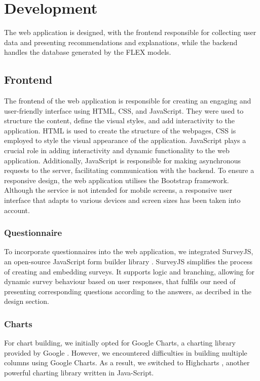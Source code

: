 \chapter{Development}

The web application is designed, 
with the frontend responsible for collecting user data and presenting recommendations and explanations, 
while the backend handles the database generated by the FLEX models. 


\section{Frontend}

The frontend of the web application is responsible for creating an engaging and user-friendly interface using HTML, CSS, and JavaScript. 
They were used to structure the content, define the visual styles, and add interactivity to the application.
HTML is used to create the structure of the webpages, CSS is employed to style the visual appearance of the application. 
JavaScript plays a crucial role in adding interactivity and dynamic functionality to the web application. 
Additionally, JavaScript is responsible for making asynchronous requests to the server, facilitating communication with the backend.
To ensure a responsive design, the web application utilises the Bootstrap framework. 
Although the service is not intended for mobile screens, a responsive user interface that adapts to various devices and screen sizes has been taken into account. 


\subsection{Questionnaire}

To incorporate questionnaires into the web application, we integrated SurveyJS, an open-source JavaScript form builder library \cite{surveyjs}. 
SurveyJS simplifies the process of creating and embedding surveys.
It supports logic and branching, allowing for dynamic survey behaviour based on user responses, 
that fulfils our need of presenting corresponding questions according to the answers, as decribed in the design section. 


\subsection{Charts}

For chart building, we initially opted for Google Charts, a charting library provided by Google \cite{googlecharts}. 
However, we encountered difficulties in building multiple columns using Google Charts. 
As a result, we switched to Highcharts \cite{highcharts}, another powerful charting library written in Java-Script. 


